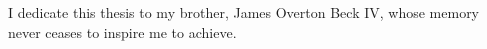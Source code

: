 
I dedicate this thesis to my brother, James Overton Beck IV, whose memory never ceases to inspire me to achieve. 